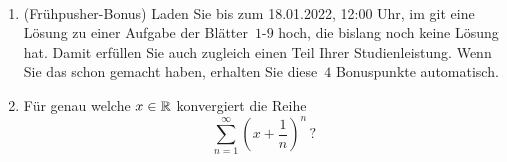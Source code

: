 \begin{aufg}\mbox{ }
\begin{enumerate}[label=$\mathrm{(\roman*)}$, ref=$\mathrm{\roman*}$]
\item (Fr\"uhpusher-Bonus) Laden Sie bis zum 18.01.2022, 12:00 Uhr, im git eine L\"osung zu einer Aufgabe der Bl\"atter~$1$-$9$ hoch, die bislang noch keine L\"osung hat. Damit erf\"ullen Sie auch zugleich einen Teil Ihrer Studienleistung. Wenn Sie das schon gemacht haben, erhalten Sie diese~$4$ Bonuspunkte automatisch.
%
\item F\"ur genau welche $x\in\mathbb{R}$ konvergiert die Reihe
\[ 
\sum_{n=1}^\infty\left(x+\frac{1}{n}\right)^n\,?
\]
\end{enumerate}
\end{aufg}


\bigskip

\begin{lsg}
\end{lsg}

